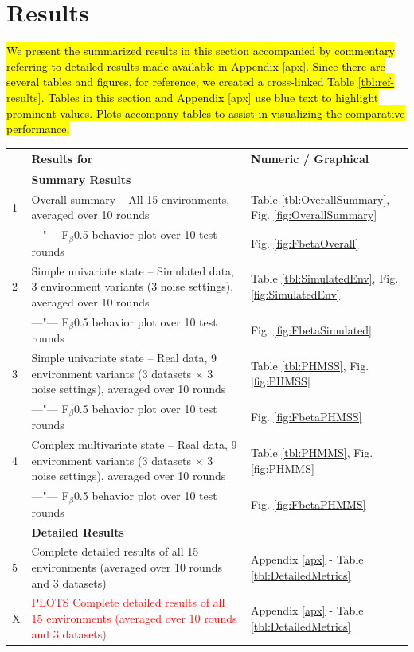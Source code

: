 \documentclass[a4paper, 12pt]{article}
\newcommand{\hlc}[2][cyan!10]{{\colorlet{foo}{#1} \sethlcolor{foo}\hl{#2}}}
\newcommand{\rowspace}[1]{\renewcommand{\arraystretch}{#1}}
\begin{document}
\section{Results}\label{sec:Results}
\hlc{We present the summarized results in this section accompanied by commentary referring to detailed results made available in Appendix {\ref{apx}}. Since there are several tables and figures, for reference, we created a cross-linked Table {\ref{tbl:ref-results}}. Tables in this section and Appendix {\ref{apx}} use {\textcolor{dblue}{blue}} text to highlight prominent values. Plots accompany tables to assist in visualizing the comparative performance.}
\begin{table}[h]\centering
	\sffamily
	\rowspace{1.3}
	\begin{tabular}{R{0.25cm} L{11.5cm} L{3cm}}
		\toprule 
		  & Results for & Numeric / Graphical\\ \midrule
		   & \textbf{Summary Results}  & \\ 
		1 & Overall summary -- All 15 environments, averaged over 10 rounds & Table \ref{tbl:OverallSummary}, Fig. \ref{fig:OverallSummary}\\
		  & \quad\quad ---"--- F$_\beta$0.5 behavior plot over 10 test rounds & Fig. \ref{fig:FbetaOverall}\\
		2 & Simple univariate state -- Simulated data, 3 environment variants (3 noise settings), averaged over 10 rounds & Table \ref{tbl:SimulatedEnv}, Fig. \ref{fig:SimulatedEnv}\\ 
 		  & \quad\quad ---"--- F$_\beta$0.5 behavior plot over 10 test rounds & Fig. \ref{fig:FbetaSimulated}\\
		3 & Simple univariate state -- Real data, 9 environment variants (3 datasets $\times$ 3 noise settings), averaged over 10 rounds & Table \ref{tbl:PHMSS}, Fig. \ref{fig:PHMSS}\\
 		  & \quad\quad ---"--- F$_\beta$0.5 behavior plot over 10 test rounds & Fig. \ref{fig:FbetaPHMSS}\\
		4 & Complex multivariate state -- Real data, 9 environment variants (3 datasets $\times$ 3 noise settings), averaged over 10 rounds & Table \ref{tbl:PHMMS}, Fig. \ref{fig:PHMMS}\\
 		  & \quad\quad ---"--- F$_\beta$0.5 behavior plot over 10 test rounds & Fig. \ref{fig:FbetaPHMMS}\\	\midrule
 		   & \textbf{Detailed Results}  & \\ 
		5 & Complete detailed results of all 15 environments (averaged over 10 rounds and 3 datasets) & Appendix \ref{apx} - Table \ref{tbl:DetailedMetrics}\\
		X & \textcolor{red}{PLOTS Complete detailed results of all 15 environments (averaged over 10 rounds and 3 datasets)} & Appendix \ref{apx} - Table \ref{tbl:DetailedMetrics}\\
		

\end{tabular}
\end{table}
\end{document}
